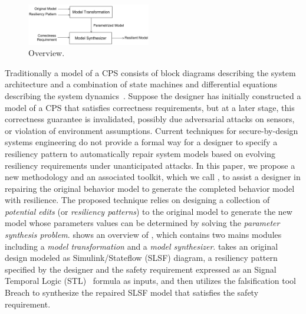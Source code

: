 %
\begin{figure}[t!]%
	\centering%
    \includegraphics[width=0.48\textwidth]{image/overview}%
	\caption{\toolreaffirm Overview.}%
\end{figure}%
Traditionally a model of a CPS consists of block diagrams describing the system architecture and a combination of state machines and differential equations describing the system dynamics~\cite{alur1995algorithmic}. Suppose the designer has initially constructed a model of a CPS that satisfies correctness requirements, but at a later stage, this correctness guarantee is invalidated, possibly due adversarial attacks on sensors, or violation of environment assumptions. Current techniques for secure-by-design systems engineering do not provide a formal way for a designer to specify a resiliency pattern to automatically repair system models based on evolving resiliency requirements under unanticipated attacks. In this paper, we propose a new methodology and an associated toolkit, which we call \toolreaffirm, to assist a designer in repairing the original behavior model to generate the completed behavior model with resilience. %
%
The proposed technique relies on designing a collection of \emph{potential edits} (or \emph{resiliency patterns}) to the original model to generate the new model whose parameters values can be determined by solving the \emph{parameter synthesis problem}. 
%
%
%
 shows an overview of \toolreaffirm, which contains two mains modules including a \emph{model transformation} and a \emph{model synthesizer}.
\toolreaffirm takes an original design modeled as Simulink/Stateflow (SLSF) diagram, a resiliency pattern specified by the designer and the safety requirement expressed as an Signal Temporal Logic (STL)~\cite{maler2004monitoring} formula as inputs, and then utilizes the falsification tool Breach to synthesize the repaired SLSF model that satisfies the safety requirement.

